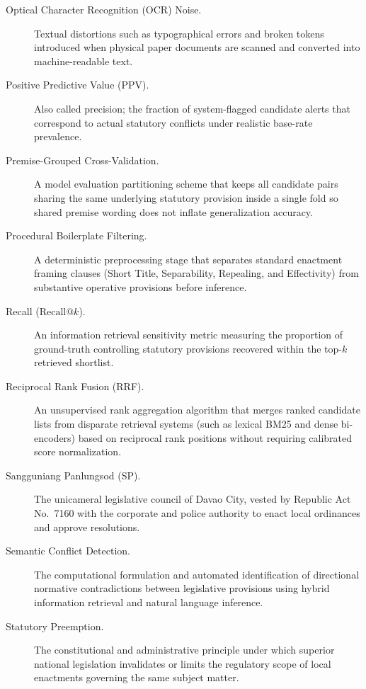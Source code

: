 \begin{description}
    \item[Optical Character Recognition (OCR) Noise.] Textual distortions such as typographical errors and broken tokens introduced when physical paper documents are scanned and converted into machine-readable text.

    \item[Positive Predictive Value (PPV).] Also called precision; the fraction of system-flagged candidate alerts that correspond to actual statutory conflicts under realistic base-rate prevalence.

    \item[Premise-Grouped Cross-Validation.] A model evaluation partitioning scheme that keeps all candidate pairs sharing the same underlying statutory provision inside a single fold so shared premise wording does not inflate generalization accuracy.

    \item[Procedural Boilerplate Filtering.] A deterministic preprocessing stage that separates standard enactment framing clauses (Short Title, Separability, Repealing, and Effectivity) from substantive operative provisions before inference.

    \item[Recall ($\text{Recall}@k$).] An information retrieval sensitivity metric measuring the proportion of ground-truth controlling statutory provisions recovered within the top-$k$ retrieved shortlist.

    \item[Reciprocal Rank Fusion (RRF).] An unsupervised rank aggregation algorithm that merges ranked candidate lists from disparate retrieval systems (such as lexical BM25 and dense bi-encoders) based on reciprocal rank positions without requiring calibrated score normalization.

    \item[Sangguniang Panlungsod (SP).] The unicameral legislative council of Davao City, vested by Republic Act No.~7160 with the corporate and police authority to enact local ordinances and approve resolutions.

    \item[Semantic Conflict Detection.] The computational formulation and automated identification of directional normative contradictions between legislative provisions using hybrid information retrieval and natural language inference.

    \item[Statutory Preemption.] The constitutional and administrative principle under which superior national legislation invalidates or limits the regulatory scope of local enactments governing the same subject matter.


\end{description}
